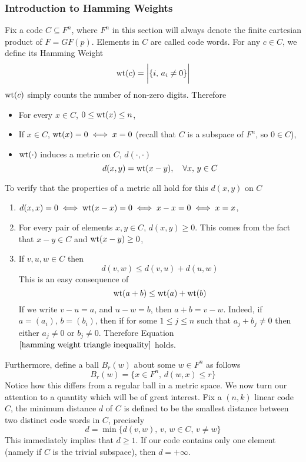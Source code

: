 \documentclass[../../main.tex]{subfiles}
\begin{document}
\subsubsection{Introduction to Hamming Weights}
Fix a code $C\subseteq F^n$, where $F^n$ in this section will always denote the finite cartesian product of $F=GF(p)$. Elements in $C$ are called code words. For any $c\in C$, we define its Hamming Weight 
\[
\operatorname{wt}(c) = \biggl|\{i,\,a_i\neq 0\}\biggr|
\]
$\operatorname{wt}(c)$ simply counts the number of non-zero digits. Therefore
\begin{itemize}
    \item For every $x\in C$, $0\leq \operatorname{wt}(x)\leq n$,
    \item If $x\in C$, $\operatorname{wt}(x)=0\iff x=0$ (recall that $C$ is a subspace of $F^n$, so $0\in C$),
    \item $\operatorname{wt}(\cdot)$ induces a metric on $C$, $d(\cdot,\cdot)$ 
    \[
    d(x,y)=\operatorname{wt}(x-y),\quad\forall x,\,y\in C
    \]
\end{itemize}
To verify that the properties of a metric all hold for this $d(x,y)$ on $C$ 
\begin{enumerate}
    \item $d(x,x)=0\iff \operatorname{wt}(x-x)=0\iff x-x=0\iff x=x$,
    \item For every pair of elements $x,y\in C$, $d(x,y)\geq 0$. This comes from the fact that $x-y\in C$ and $\operatorname{wt}(x-y)\geq 0$,
    \item If $v,u,w\in C$ then
    \[
    d(v,w)\leq d(v,u) + d(u,w)
    \]
    This is an easy consequence of 
    \begin{equation}\label{hamming weight triangle inequality}
    \operatorname{wt}(a+b)\leq \operatorname{wt}(a)+\operatorname{wt}(b)
    \end{equation}
    If we write $v-u = a$, and $u-w = b$, then $a+b = v-w$. Indeed, if $a = (a_i)$, $b=(b_i)$, then if for some $1\leq j\leq n$ such that $a_j + b_j\neq 0$ then either $a_j\neq 0$ or $b_j\neq 0$. Therefore Equation $\eqref{hamming weight triangle inequality}$ holds.
\end{enumerate}
Furthermore, define a ball $B_r(w)$ about some $w\in F^n$ as follows
\begin{equation}\label{ball definition in F^n}
B_r(w) = \{x\in F^n,\, d(w,x)\leq r\}
\end{equation}
Notice how this differs from a regular ball in a metric space. We now turn our attention to a quantity which will be of great interest. Fix a $(n,k)$ linear code $C$, the minimum distance $d$ of $C$ is defined to be the smallest distance between two distinct code words in $C$, precisely
\begin{equation}\label{minimum distance code}
    d = \min\{d(v,w),\, v,\,w\in C,\, v\neq w\}
\end{equation}
This immediately implies that $d\geq 1$. If our code contains only one element (namely if $C$ is the trivial subspace), then $d = + \infty$.\\
\end{document}
